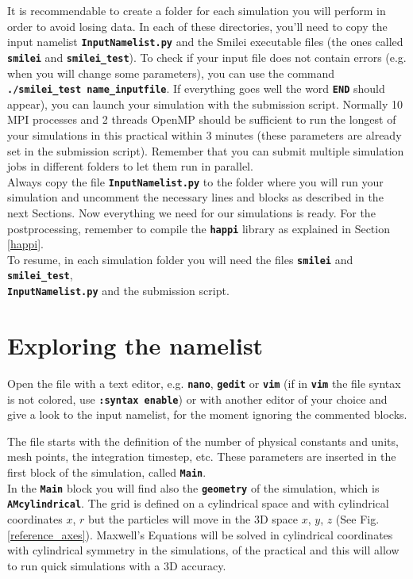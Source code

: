 \documentclass{article}
\newcommand{\smilei}{{\sc Smilei}\xspace}
\newcommand{\commandline}[1]{\texttt{\textbf{#1}}}
\begin{document}
It is recommendable to create a folder for each simulation you will perform in order to avoid losing data. In each of these directories, you'll need to copy the input namelist \commandline{InputNamelist.py} and the \smilei executable files (the ones called \commandline{smilei} and \commandline{smilei\_test}). To check if your input file does not contain errors (e.g. when you will change some parameters), you can use the command \commandline{./smilei\_test name\_inputfile}. If everything goes well the word \commandline{END} should appear), you can launch your simulation with the submission script. Normally 10 MPI processes and 2 threads OpenMP should be sufficient to run the longest of your simulations in this practical within 3 minutes (these parameters are already set in the submission script). Remember that you can submit multiple simulation jobs in different folders to let them run in parallel.\\

Always copy the file \commandline{InputNamelist.py} to the folder where you will run your simulation and uncomment the necessary lines and blocks as described in the next Sections. Now everything we need for our simulations is ready. For the postprocessing, remember to compile the \commandline{happi} library as explained in Section \ref{happi}.\\

To resume, in each simulation folder you will need the files \commandline{smilei} and \commandline{smilei\_test},\\ \commandline{InputNamelist.py} and the submission script.

\section{Exploring the namelist}
Open the file with a text editor, e.g. \commandline{nano}, \commandline{gedit} or \commandline{vim} (if in \commandline{vim} the file syntax is not colored, use \commandline{:syntax enable}) or with another editor of your choice and give a look to the input namelist, for the moment ignoring the commented blocks. 

The file starts with the definition of the number of physical constants and units, mesh points, the integration timestep, etc. These parameters are inserted in the first block of the simulation, called \commandline{Main}.\\

In the  \commandline{Main} block you will find also the  \commandline{geometry} of the simulation, which is \commandline{AMcylindrical}. The grid is  defined on a cylindrical space and with cylindrical coordinates $x$, $r$ but the particles will move in the 3D  space $x$, $y$, $z$ (See Fig. \ref{reference_axes}). Maxwell's Equations will be solved in cylindrical coordinates with cylindrical symmetry in the simulations, of the practical and this will allow to run quick simulations with a 3D accuracy.\\
\end{document}
